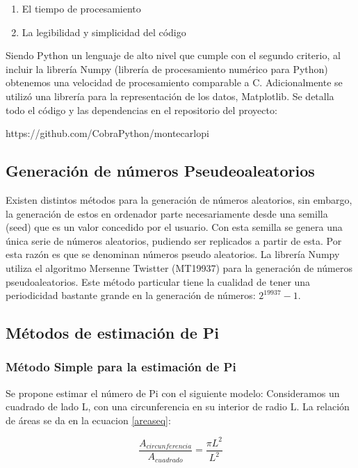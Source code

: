\documentclass{rbf}
\begin{document}
\begin{enumerate}
    \item El tiempo de procesamiento
    \item La legibilidad y simplicidad del código
\end{enumerate}


Siendo Python un lenguaje de alto nivel que cumple con el segundo criterio, al incluir la librería Numpy (librería de procesamiento numérico para Python) obtenemos una velocidad de procesamiento comparable a C. Adicionalmente se utilizó una librería para la representación de los datos, Matplotlib.
Se detalla todo el código y las dependencias en el repositorio del proyecto:

https://github.com/CobraPython/montecarlopi

\subsection{Generación de números Pseudeoaleatorios}

Existen distintos métodos para la generación de números aleatorios, sin embargo, la generación de estos en ordenador parte necesariamente desde una semilla (seed) que es un valor concedido por el usuario. Con esta semilla se genera una única serie de números aleatorios, pudiendo ser replicados a partir de esta. Por esta razón es que se denominan números pseudo aleatorios.
La librería Numpy utiliza el algoritmo Mersenne Twistter\cite{Tanguy} (MT19937) para la generación de números pseudoaleatorios. Este método particular tiene la cualidad de tener una periodicidad bastante grande en la generación de números: $2^19937-1$\cite{Makoto}.

\subsection{Métodos de estimación de Pi}
\subsubsection{Método Simple para la estimación de Pi}

Se propone estimar el número de Pi con el siguiente modelo:
Consideramos un cuadrado de lado L, con una circunferencia en su interior de radio L.
La relación de áreas se da en la ecuacion \ref{areaseq}:

\begin{equation}
	\frac{A_{circunferencia}}{A_{cuadrado}}=\frac{\pi L^2}{L^2}
\label{areaseq}	
\end{equation}
\end{document}
